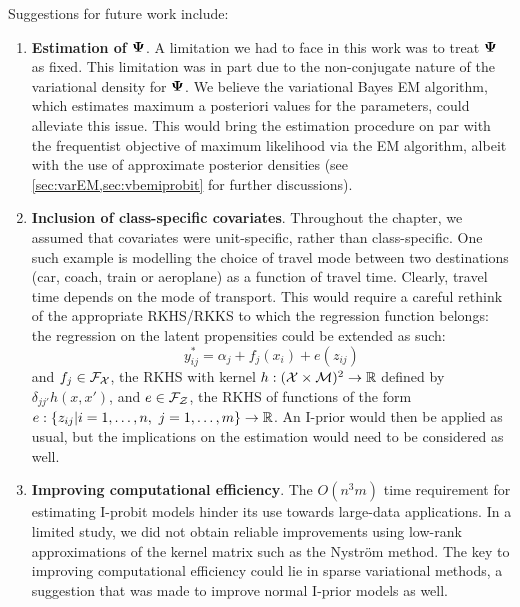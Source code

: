 \documentclass[a4paper,showframe,11pt]{report}
\begin{document}
Suggestions for future work include:
\begin{enumerate}
  \item \textbf{Estimation of ${\bm\Psi}$}. 
  A limitation we had to face in this work was to treat ${\bm\Psi}$ as fixed.
  This limitation was in part due to the non-conjugate nature of the variational density for ${\bm\Psi}$.
  We believe the variational Bayes EM algorithm, which estimates maximum a posteriori values for the parameters, could alleviate this issue.
  This would bring the estimation procedure on par with the frequentist objective of maximum likelihood via the EM algorithm, albeit with the use of approximate posterior densities (see \cref{sec:varEM,sec:vbemiprobit} for further discussions).
  
  \item \textbf{Inclusion of class-specific covariates}. 
  Throughout the chapter, we assumed that covariates were unit-specific, rather than class-specific. 
  One such example is modelling the choice of travel mode between two destinations (car, coach, train or aeroplane) as a function of travel time. 
  Clearly, travel time depends on the mode of transport. 
  This would require a careful rethink of the appropriate RKHS/RKKS to which the regression function belongs: the regression on the latent propensities could be extended as such:
  \[
    y_{ij}^* = \alpha_j + f_j(x_i) + e(z_{ij})
  \]
  and $f_j\in {\mathcal F}_{\mathcal X}$, the RKHS with kernel $h:({\mathcal X} \times {\mathcal M})^2\to\mathbb{R}$ defined by $\delta_{jj'}h(x,x')$, and $e \in {\mathcal F}_{\mathcal Z}$, the RKHS of functions of the form $e:\{z_{ij}|i=1,\dots,n, \ j=1,\dots,m \}\to\mathbb{R}$.
  An I-prior would then be applied as usual, but the implications on the estimation would need to be considered as well.
  
  \item \textbf{Improving computational efficiency}. 
  The $O(n^3m)$ time requirement for estimating I-probit models hinder its use towards large-data applications.
  In a limited study, we did not obtain reliable improvements using low-rank approximations of the kernel matrix such as the Nyström method.
  The key to improving computational efficiency could lie in sparse variational methods, a suggestion that was made to improve normal I-prior models as well.
\end{enumerate}
\end{document}
